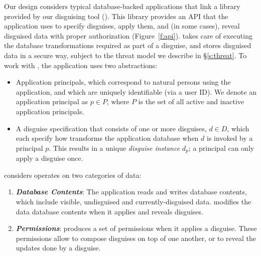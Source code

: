 %
Our design considers typical database-backed applications that link a library provided by our disguising
tool (\sys).
%
This library provides an API that the application uses to specify disguises, apply them, and (in some
cases), reveal disguised data with proper authorization (Figure~\ref{f:api}).
%
\sys takes care of executing the database transformations required as part of a disguise, and stores
disguised data in a secure way, subject to the threat model we describe in \S\ref{s:threat}.
%
To work with \sys, the application uses two abstractions:
\begin{itemize}
    \item Application principals, which correspond to natural persons using the application, and
	which are uniquely identifiable (\eg via a user ID).
	We denote an application principal as $p \in P$, where $P$ is the set of all active and
	inactive application principals.
    \item A disguise specification that consists of one or more disguises, $d \in D$, which each specify
	how \sys transforms the application database when $d$ is invoked by a principal $p$.
	This results in a unique \emph{disguise instance} $d_p$; a principal can only apply a disguise
        once.
\end{itemize}
%
\sys considers operates on two categories of data:
\begin{enumerate}
    \item \emph{\textbf{Database Contents}}: The application reads and writes database
        contents, which include visible, undisguised and currently-disguised data.
        \sys modifies the data database contents when it applies and reveals disguises.
    \item \emph{\textbf{Permissions}}: \sys produces a set of permissions when it applies a
        disguise. These permissions allow \sys to compose disguises on top of one another, or to
        reveal the updates done by a disguise. 
\end{enumerate}

